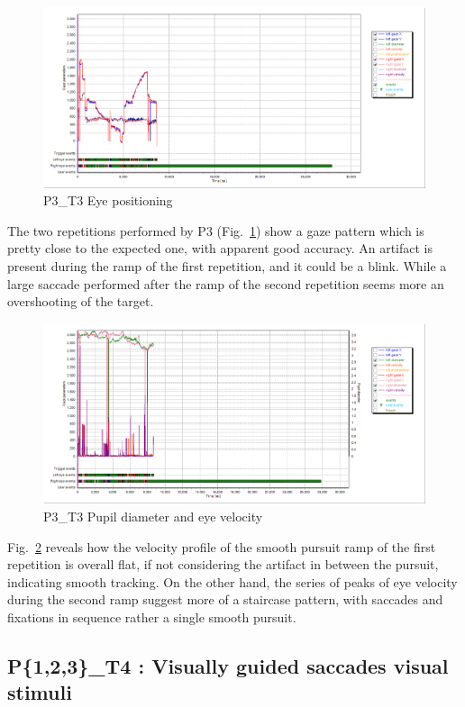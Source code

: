 \begin{figure}[h]
  \centering
  \includegraphics[width=.8\textwidth]{figures/graphs/P3_T3(stepRamp)_XY.png}
  \caption[P3\_T3 Eye positioning]{P3\_T3 Eye positioning}
  \label{fig:P3_T3_pos}
\end{figure}

The two repetitions performed by P3 (Fig.~\ref{fig:P3_T3_pos})  show a gaze pattern which is pretty close to the expected one, with apparent good accuracy. An artifact is present during the ramp of the first repetition, and it could be a blink. While a large saccade performed after the ramp of the second repetition seems more an overshooting of the target.

\begin{figure}[h]
  \centering
  \includegraphics[width=.8\textwidth]{figures/graphs/P3_T3(stepRamp)_VP.png}
  \caption[P3\_T3 Pupil size and velocity profile]{P3\_T3 Pupil diameter and eye velocity}
  \label{fig:P3_T3_vel}
\end{figure}

Fig.~\ref{fig:P3_T3_vel} reveals how the velocity profile of the smooth pursuit ramp of the first repetition is overall flat, if not considering the artifact in between the pursuit, indicating smooth tracking. On the other hand, the series of peaks of eye velocity during the second ramp suggest more of a staircase pattern, with saccades and fixations in sequence rather a single smooth pursuit.

\subsection{P\{1,2,3\}\_T4 : Visually guided saccades visual stimuli}
\label{sec:P123_T4}


